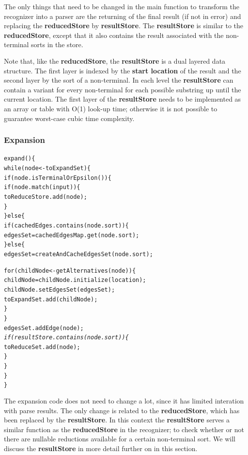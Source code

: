 \documentclass[a4paper,10pt]{article}
\begin{document}
The only things that need to be changed in the main function to transform the recognizer into a parser are the returning of the final result (if not in error) and replacing the {\bf reducedStore} by {\bf resultStore}. The {\bf resultStore} is similar to the {\bf reducedStore}, except that it also contains the result associated with the non-terminal sorts in the store.

Note that, like the {\bf reducedStore}, the {\bf resultStore} is a dual layered data structure. The first layer is indexed by the {\bf start location} of the result and the second layer by the sort of a non-terminal. In each level the {\bf resultStore} can contain a variant for every non-terminal for each possible substring up until the current location. The first layer of the {\bf resultStore} needs to be implemented as an array or table with O(1) look-up time; otherwise it is not possible to guarantee worst-case cubic time complexity.

\pagebreak
\subsubsection{Expansion}
{\small
\begin{alltt}
expand()\{
  while(node <- toExpandSet)\{
    if(node.isTerminalOrEpsilon())\{
      if(node.match(input))\{
        toReduceStore.add(node);
      \}
    \}else\{
      if(cachedEdges.contains(node.sort))\{
        edgesSet = cachedEdgesMap.get(node.sort);
      \}else\{
        edgesSet = createAndCacheEdgesSet(node.sort);
        
        for(childNode <- getAlternatives(node))\{
          childNode = childNode.initialize(location);
          childNode.setEdgesSet(edgesSet);
          toExpandSet.add(childNode);
        \}
      \}
      edgesSet.addEdge(node);
      \textit{
      if(resultStore.contains(node.sort))\{}
        toReduceSet.add(node);
      \}
    \}
  \}
\}
\end{alltt}
}

The expansion code does not need to change a lot, since it has limited interation with parse results. The only change is related to the {\bf reducedStore}, which has been replaced by the {\bf resultStore}. In this context the {\bf resultStore} serves a similar function as the {\bf reducedStore} in the recognizer; to check whether or not there are nullable reductions available for a certain non-terminal sort. We will discuss the {\bf resultStore} in more detail further on in this section.
\end{document}
